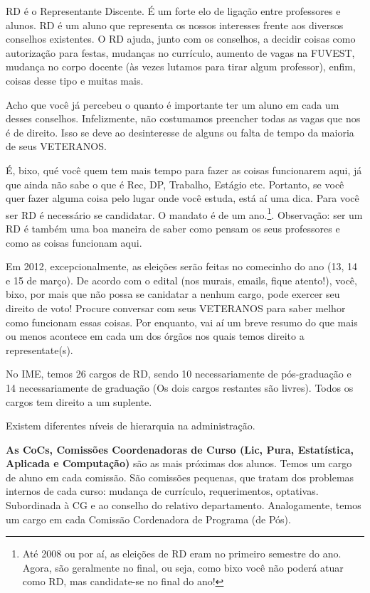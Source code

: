\documentclass[11pt]{report}
\newenvironment{secao}[1] {
    \framebox[\textwidth] {
        \rule[-1.2ex]{5ex}{5.5ex}
        {\Large\sf #1}
        \hspace{\stretch{1}}
    } \addcontentsline{toc}{chapter}{#1}
    \nopagebreak[4]
} { 
}
\begin{document}
\begin{secao}{O que é RD?}

RD é o Representante Discente. É um forte elo de ligação entre professores e alunos. 
RD é um aluno que representa os nossos interesses frente aos diversos conselhos existentes.
O RD ajuda, junto com os conselhos, a decidir coisas como autorização para festas, 
mudanças no currículo, aumento de vagas na FUVEST, mudança no corpo docente (às 
vezes lutamos para tirar algum professor), enfim, coisas desse tipo e muitas mais. 

Acho que você já percebeu o quanto é importante ter um aluno em cada um desses conselhos. 
Infelizmente, não costumamos preencher todas as vagas que nos é de direito. Isso se 
deve ao desinteresse de alguns ou  falta de tempo da maioria de seus VETERANOS. 

É, bixo, qué você quem tem mais tempo para fazer as coisas funcionarem aqui, já que 
ainda não sabe o que é Rec, DP, Trabalho, Estágio etc. Portanto, se você quer fazer 
alguma coisa pelo lugar onde você estuda, está aí uma dica. Para você ser RD é 
necessário se candidatar. O mandato é de um ano.\footnote{Até 2008 ou por aí, as eleições de RD eram no primeiro semestre do ano. Agora, são geralmente no final, ou seja, como bixo você não poderá atuar como RD, mas candidate-se no final do ano!}. Observação: ser um RD é também uma boa maneira de saber como pensam os seus professores e como as coisas funcionam aqui.

Em 2012, excepcionalmente, as eleições serão feitas no comecinho do ano (13, 14 e 15 de março). De acordo com o edital (nos murais, emails, fique atento!), você, bixo, por mais que não possa se canidatar a nenhum cargo, pode exercer seu direito de voto! Procure conversar com seus VETERANOS para saber melhor como funcionam essas coisas. Por enquanto, vai aí um breve resumo do que mais ou menos acontece em cada um dos órgãos nos quais temos direito a representate(s).
  
No IME, temos 26 cargos de RD, sendo 10 necessariamente de
pós-graduação e 14 necessariamente de graduação (Os dois cargos
restantes são livres). Todos os cargos tem direito a um suplente.
 
Existem diferentes níveis de hierarquia na administração.
 
{\bf As CoCs,
Comissões Coordenadoras de Curso (Lic, Pura, Estatística, Aplicada e
Computação)} são as mais próximas dos alunos. Temos um cargo de aluno em cada comissão. São comissões
pequenas, que tratam
dos problemas internos de cada curso: mudança de currículo,
requerimentos, optativas. Subordinada à CG e ao conselho do relativo
departamento. Analogamente, temos um cargo em cada Comissão
Cordenadora de Programa (de Pós).
 

\end{secao}
\end{document}
